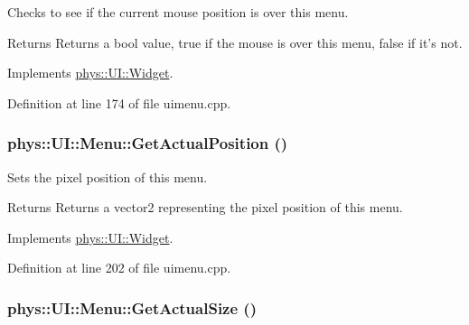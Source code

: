 Checks to see if the current mouse position is over this menu. 

\begin{DoxyReturn}{Returns}
Returns a bool value, true if the mouse is over this menu, false if it's not. 
\end{DoxyReturn}


Implements \hyperlink{classphys_1_1UI_1_1Widget_a613df6dbb42efe139d185043a00259dc}{phys::UI::Widget}.



Definition at line 174 of file uimenu.cpp.

\hypertarget{classphys_1_1UI_1_1Menu_a74a1b8e9b1c5d36c12e5a0a7f813c40a}{
\subsubsection[{GetActualPosition}]{ phys::UI::Menu::GetActualPosition ()}}
\label{d6/dd3/classphys_1_1UI_1_1Menu_a74a1b8e9b1c5d36c12e5a0a7f813c40a}


Sets the pixel position of this menu. 

\begin{DoxyReturn}{Returns}
Returns a vector2 representing the pixel position of this menu. 
\end{DoxyReturn}


Implements \hyperlink{classphys_1_1UI_1_1Widget_a0a29fecff7f56d7909f65fd63b0990e7}{phys::UI::Widget}.



Definition at line 202 of file uimenu.cpp.

\hypertarget{classphys_1_1UI_1_1Menu_af7566b83c50a4a02ac78d174d7c61817}{
\subsubsection[{GetActualSize}]{ phys::UI::Menu::GetActualSize ()}}
\label{d6/dd3/classphys_1_1UI_1_1Menu_af7566b83c50a4a02ac78d174d7c61817}



